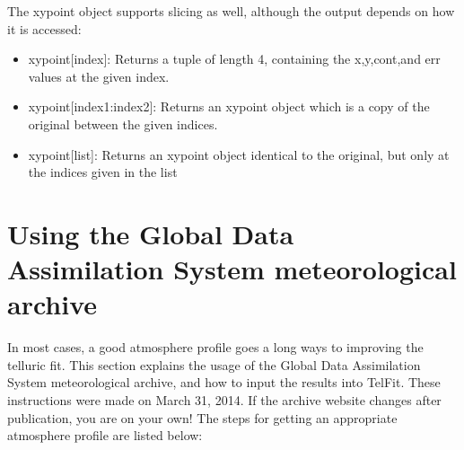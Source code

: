 \documentclass{article}
\begin{document}
\begin{itemize}
\begin{itemize}
  
\end{itemize}
  
The xypoint object supports slicing as well, although the output depends on how it is accessed:
\begin{itemize}

  \item xypoint[index]: Returns a tuple of length 4, containing the x,y,cont,and err values at the given index.
  \item xypoint[index1:index2]: Returns an xypoint object which is a copy of the original between the given indices. 
  \item xypoint[list]: Returns an xypoint object identical to the original, but only at the indices given in the list

\end{itemize}




\end{itemize}



\appendix
\section{Using the Global Data Assimilation System meteorological archive}

\label{ap:gdas}

In most cases, a good atmosphere profile goes a long ways to improving the telluric fit. This section explains the usage of the Global Data Assimilation System meteorological archive, and how to input the results into TelFit. These instructions were made on March 31, 2014. If the archive website changes after publication, you are on your own! The steps for getting an appropriate atmosphere profile are listed below:
\end{document}
